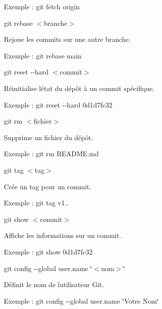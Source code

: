 \begin{DoxyEnumerate}
\begin{DoxyItemize}
\item Exemple \+: {\ttfamily git fetch origin}
\end{DoxyItemize}
\item {\ttfamily git rebase $<$branche$>$}
\begin{DoxyItemize}
\item Rejoue les commits sur une autre branche.
\item Exemple \+: {\ttfamily git rebase main}
\end{DoxyItemize}
\item {\ttfamily git reset -\/-\/hard $<$commit$>$}
\begin{DoxyItemize}
\item Réinitialise l\textquotesingle{}état du dépôt à un commit spécifique.
\item Exemple \+: {\ttfamily git reset -\/-\/hard 0d1d7fc32}
\end{DoxyItemize}
\item {\ttfamily git rm $<$fichier$>$}
\begin{DoxyItemize}
\item Supprime un fichier du dépôt.
\item Exemple \+: {\ttfamily git rm R\+E\+A\+D\+M\+E.\+md}
\end{DoxyItemize}
\item {\ttfamily git tag $<$tag$>$}
\begin{DoxyItemize}
\item Crée un tag pour un commit.
\item Exemple \+: {\ttfamily git tag v1..}
\end{DoxyItemize}
\item {\ttfamily git show $<$commit$>$}
\begin{DoxyItemize}
\item Affiche les informations sur un commit.
\item Exemple \+: {\ttfamily git show 0d1d7fc32}
\end{DoxyItemize}
\item {\ttfamily git config -\/-\/global user.\+name \char`\"{}$<$nom$>$\char`\"{}}
\begin{DoxyItemize}
\item Définit le nom de l\textquotesingle{}utilisateur Git.
\item Exemple \+: {\ttfamily git config -\/-\/global user.\+name \char`\"{}\+Votre Nom\char`\"{}}
\end{DoxyItemize}
\end{DoxyEnumerate}

